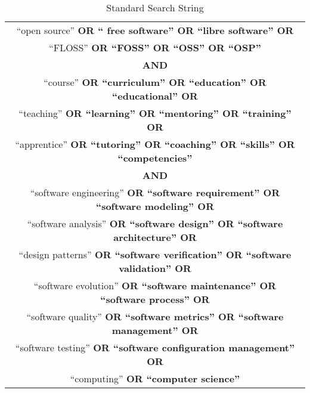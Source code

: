 \begin{table}
    \centering
	\caption {Standard Search String}
	  {\begin{tabular}{c}
		\hline
		``open source'' \bf OR `` free software'' \bf OR ``libre software'' 
		\bf OR \\
		``FLOSS'' \bf OR ``FOSS'' \bf OR ``OSS'' \bf OR ``OSP'' \\ 
		\hline
		\bf AND 
		\\
		\hline
		``course'' \bf OR  ``curriculum''  \bf OR ``education''  \bf OR 
		``educational''  \bf OR \\
		``teaching''  \bf OR  ``learning''  \bf OR ``mentoring''  \bf OR
		``training''  \bf OR \\``apprentice''  \bf OR ``tutoring''  \bf OR  
		``coaching''  \bf OR ``skills''  \bf OR ``competencies''  \\
		\hline
		\bf AND \\
		\hline
		``software engineering'' \bf OR ``software requirement'' \bf OR ``software modeling'' \bf OR  \\
		``software analysis'' \bf OR  ``software design'' \bf OR ``software architecture''  \bf OR  \\
		``design patterns''  \bf OR ``software verification'' \bf OR ``software validation''  \bf OR \\
		``software evolution''  \bf OR ``software maintenance'' \bf OR ``software process'' \bf OR \\
		``software quality''  \bf OR ``software metrics''  \bf OR ``software management''  \bf OR \\
		``software testing'' \bf OR ``software configuration management'' \bf OR \\
		``computing''  \bf OR ``computer science'' \\
		\hline
	\end{tabular}}
	\label{tab:searchString}
\end{table}
